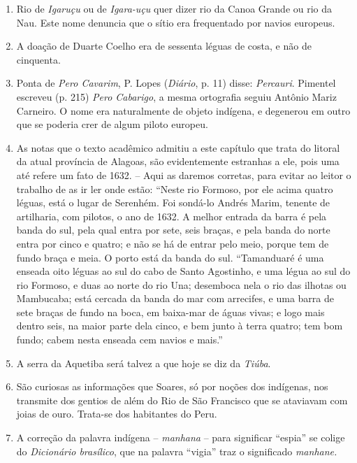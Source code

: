 \begin{enumerate}
\item Rio de \textit{Igaruçu} ou de \textit{Igara-uçu} quer dizer rio da Canoa Grande ou rio da Nau. Este 
nome denuncia que o sítio era frequentado por navios europeus.

\item A doação de Duarte Coelho era de sessenta léguas de costa, e não de cinquenta.

\item Ponta de \textit{Pero Cavarim}, P. Lopes (\textit{Diário}, p. 11) disse: \textit{Percauri}. Pimentel 
escreveu (p. 215) \textit{Pero Cabarigo}, a mesma ortografia seguiu Antônio Mariz Carneiro. 
O nome era naturalmente de objeto indígena, e degenerou em outro que se poderia crer 
de algum piloto europeu.

\item As notas que o texto acadêmico admitiu a este capítulo que trata do litoral da atual 
província de Alagoas, são evidentemente estranhas a ele, pois uma até refere um fato de 
1632. -- Aqui as daremos corretas, para evitar ao leitor o trabalho de as ir ler onde 
estão: ``Neste rio Formoso, por ele acima quatro léguas, está o lugar de Serenhém. 
Foi sondá-lo Andrés Marim, tenente de artilharia, com pilotos, o ano de 1632. A melhor entrada da 
barra é pela banda do sul, pela qual entra por sete, seis braças, e pela banda do norte entra 
por cinco e quatro; e não se há de entrar pelo meio, porque tem de fundo braça e meia. O 
porto está da banda do sul. ``Tamanduaré é uma enseada oito léguas ao sul do cabo de Santo Agostinho, e uma 
légua ao sul do rio Formoso, e duas ao norte do rio Una; desemboca nela o rio das ilhotas ou 
Mambucaba; está cercada da banda do mar com arrecifes, e uma barra de sete braças de 
fundo na boca, em baixa-mar de águas vivas; e logo mais dentro seis, na maior parte dela 
cinco, e bem junto à terra quatro; tem bom fundo; cabem nesta enseada cem navios e mais.'' 

\item A serra da Aquetiba será talvez a que hoje se diz da \textit{Tiúba}.

\item São curiosas as informações que Soares, só por noções dos indígenas, nos transmite 
dos gentios de além do Rio de São Francisco que se ataviavam com joias de ouro. Trata-se dos habitantes do Peru.

\item A correção da palavra indígena -- \textit{manhana} -- para significar ``espia'' se colige do 
\textit{Dicionário brasílico}, que na palavra ``vigia'' traz o significado \textit{manhane.}


\end{enumerate}
